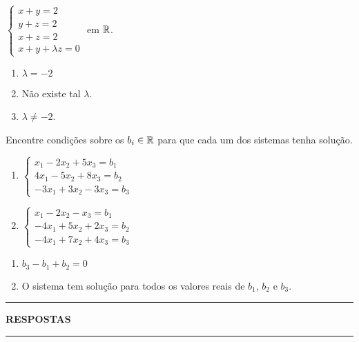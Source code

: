 \documentclass[12pt]{exam}
\begin{document}
\begin{exercicio}\label{sistemasfim}
  $
    \begin{cases}
      x + y = 2\\
      y + z = 2\\
      x + z = 2\\
      x + y + \lambda z = 0
    \end{cases}
  $
  em $\mathbb{R}$.
  \begin{solucao}
    \begin{enumerate}[label={\alph*})]
      \item $\lambda = -2$
      \item Não existe tal $\lambda$.
      \item $\lambda \ne -2$.
    \end{enumerate}
  \end{solucao}
\end{exercicio}

\begin{exercicio}
  Encontre condições sobre os $b_i \in \mathbb{R}$ para que cada um dos sistemas tenha solução.
  \begin{enumerate}[label={\alph*})]
    \item $\begin{cases}
      x_1 - 2x_2 + 5x_3 = b_1\\
      4x_1 - 5x_2 + 8x_3 = b_2\\
      -3x_1 + 3x_2 - 3x_3 = b_3
    \end{cases}$

    \item $\begin{cases}
      x_1 - 2x_2 - x_3 = b_1\\
      -4x_1 + 5x_2 + 2x_3 = b_2\\
      -4x_1 + 7x_2 + 4x_3 = b_3
    \end{cases}$
  \end{enumerate}
  \begin{solucao}
    \begin{enumerate}[label={\alph*})]
      \item $b_3 - b_1 + b_2 = 0$
      \item O sistema tem solução para todos os valores reais de $b_1$, $b_2$ e $b_3$.
    \end{enumerate}
  \end{solucao}
\end{exercicio}

\newpage
{}
\hrule
\begin{center}
{\large\bf RESPOSTAS}
\end{center}
\hrule

\end{document}
